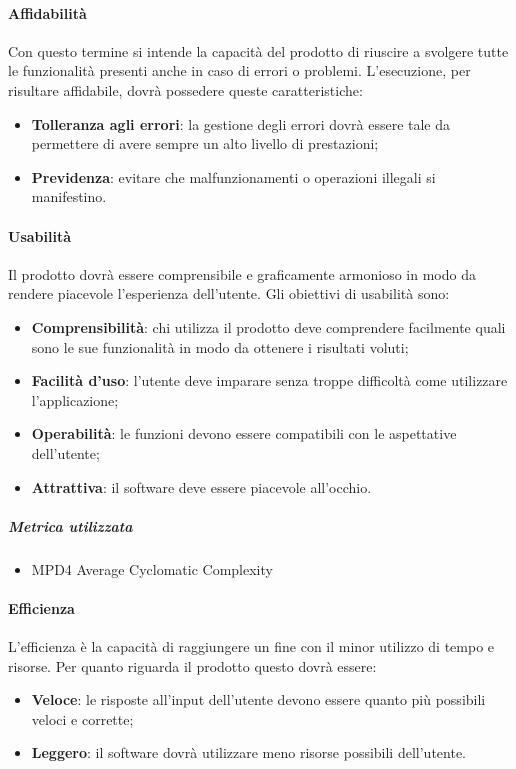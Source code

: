 \paragraph{Affidabilità}
Con questo termine si intende la capacità del prodotto di riuscire a svolgere tutte le funzionalità presenti anche in caso di errori o problemi. L'esecuzione, per risultare affidabile, dovrà possedere queste caratteristiche:
\begin{itemize}
\item \textbf{Tolleranza agli errori}: la gestione degli errori dovrà essere tale da permettere di avere sempre un alto livello di prestazioni;
\item \textbf{Previdenza}: evitare che malfunzionamenti o operazioni illegali si manifestino.
\end{itemize}
\paragraph{Usabilità}
Il prodotto dovrà essere comprensibile e graficamente armonioso in modo da rendere piacevole l'esperienza dell'utente. Gli obiettivi di usabilità sono:
\begin{itemize}
\item \textbf{Comprensibilità}: chi utilizza il prodotto deve comprendere facilmente quali sono le sue funzionalità in modo da ottenere i risultati voluti;
\item \textbf{Facilità d'uso}: l'utente deve imparare senza troppe difficoltà come utilizzare l'applicazione;
\item \textbf{Operabilità}: le funzioni devono essere compatibili con le aspettative dell'utente;
\item \textbf{Attrattiva}: il software deve essere piacevole all'occhio.
\end{itemize} 
\subparagraph{Metrica utilizzata}
\begin{itemize}
\item MPD4 Average Cyclomatic Complexity
\end{itemize}
\paragraph{Efficienza}
L'efficienza è la capacità di raggiungere un fine con il minor utilizzo di tempo e risorse. Per quanto riguarda il prodotto questo dovrà essere:
\begin{itemize}
\item \textbf{Veloce}: le risposte all'input dell'utente devono essere quanto più possibili veloci e corrette;
\item \textbf{Leggero}: il software dovrà utilizzare meno risorse possibili dell'utente.
\end{itemize}
